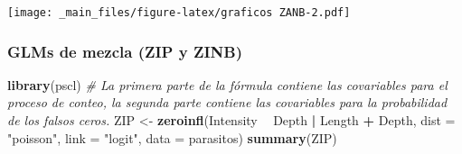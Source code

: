 \documentclass[
]{book}
\newenvironment{Shaded}{\begin{snugshade}}{\end{snugshade}}
\newcommand{\CommentTok}[1]{\textcolor[rgb]{0.56,0.35,0.01}{\textit{#1}}}
\newcommand{\DataTypeTok}[1]{\textcolor[rgb]{0.13,0.29,0.53}{#1}}
\newcommand{\DecValTok}[1]{\textcolor[rgb]{0.00,0.00,0.81}{#1}}
\newcommand{\KeywordTok}[1]{\textcolor[rgb]{0.13,0.29,0.53}{\textbf{#1}}}
\newcommand{\NormalTok}[1]{#1}
\newcommand{\OperatorTok}[1]{\textcolor[rgb]{0.81,0.36,0.00}{\textbf{#1}}}
\newcommand{\StringTok}[1]{\textcolor[rgb]{0.31,0.60,0.02}{#1}}
\begin{document}
\begin{Shaded}
\end{Shaded}

\texttt{[image: \_main\_files/figure-latex/graficos ZANB-2.pdf]}

\hypertarget{glms-de-mezcla-zip-y-zinb}{%
\subsubsection{GLMs de mezcla (ZIP y ZINB)}\label{glms-de-mezcla-zip-y-zinb}}

\begin{Shaded}
\begin{Highlighting}[]
\KeywordTok{library}\NormalTok{(pscl)}
\CommentTok{# La primera parte de la fórmula contiene las covariables para el proceso de conteo, la segunda parte contiene las covariables para la probabilidad de los falsos ceros.}
\NormalTok{ZIP <-}\StringTok{ }\KeywordTok{zeroinfl}\NormalTok{(Intensity }\OperatorTok{~}\StringTok{ }\NormalTok{Depth }\OperatorTok{|}\StringTok{ }\NormalTok{Length }\OperatorTok{+}\StringTok{ }\NormalTok{Depth, }\DataTypeTok{dist =} \StringTok{"poisson"}\NormalTok{, }
\DataTypeTok{link =} \StringTok{"logit"}\NormalTok{, }\DataTypeTok{data =}\NormalTok{ parasitos)}
\KeywordTok{summary}\NormalTok{(ZIP)}
\end{Highlighting}
\end{Shaded}
\end{document}
